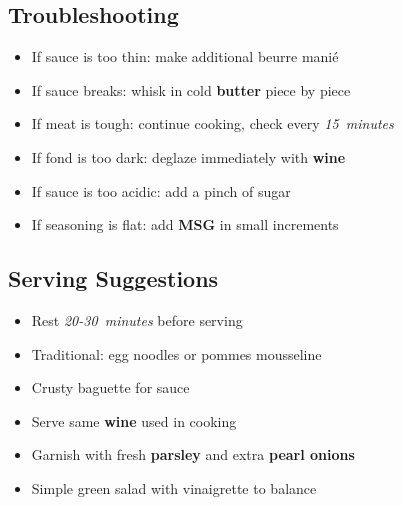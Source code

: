 \documentclass[11pt,letterpaper]{article}
\begin{document}
{\begin{multicols}{2}
\subsection*{Troubleshooting}
\begin{itemize}
    \item If sauce is too thin: make additional beurre manié
    \item If sauce breaks: whisk in cold \textbf{butter} piece by piece
    \item If meat is tough: continue cooking, check every \textit{15~minutes}
    \item If fond is too dark: deglaze immediately with \textbf{wine}
    \item If sauce is too acidic: add a pinch of sugar
    \item If seasoning is flat: add \textbf{MSG} in small increments
\end{itemize}

\subsection*{Serving Suggestions}
\begin{itemize}
    \item Rest \textit{20-30~minutes} before serving
    \item Traditional: egg noodles or pommes mousseline
    \item Crusty baguette for sauce
    \item Serve same \textbf{wine} used in cooking
    \item Garnish with fresh \textbf{parsley} and extra \textbf{pearl onions}
    \item Simple green salad with vinaigrette to balance
\end{itemize}

\end{multicols}
}
\end{document}
